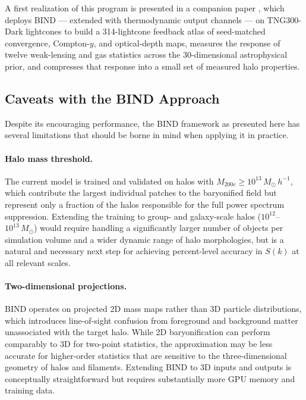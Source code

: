 \documentclass[linenumbers,trackchanges, twocolumn]{aastex701}
\begin{document}
A first realization of this program is presented in a companion paper \citep{Lee-2026c}, which deploys \textsc{BIND} --- extended with thermodynamic output channels --- on TNG300-Dark lightcones to build a 314-lightcone feedback atlas of seed-matched convergence, Compton-$y$, and optical-depth maps, measures the response of twelve weak-lensing and gas statistics across the 30-dimensional astrophysical prior, and compresses that response into a small set of measured halo properties.

\subsection{Caveats with the \textsc{BIND} Approach}
\label{subsec:caveats}

Despite its encouraging performance, the \textsc{BIND} framework as presented here has several limitations that should be borne in mind when applying it in practice.

\paragraph{Halo mass threshold.} The current model is trained and validated on halos with $M_{200c} \geq 10^{13}\,M_\odot\,h^{-1}$, which contribute the largest individual patches to the baryonified field but represent only a fraction of the halos responsible for the full power spectrum suppression. Extending the training to group- and galaxy-scale halos ($10^{12}$--$10^{13}\,M_\odot$) would require handling a significantly larger number of objects per simulation volume and a wider dynamic range of halo morphologies, but is a natural and necessary next step for achieving percent-level accuracy in $S(k)$ at all relevant scales.

\paragraph{Two-dimensional projections.} \textsc{BIND} operates on projected 2D mass maps rather than 3D particle distributions, which introduces line-of-sight confusion from foreground and background matter unassociated with the target halo. While 2D baryonification can perform comparably to 3D for two-point statistics,%
the approximation may be less accurate for higher-order statistics that are sensitive to the three-dimensional geometry of halos and filaments. Extending \textsc{BIND} to 3D inputs and outputs is conceptually straightforward but requires substantially more GPU memory and training data.
\end{document}
